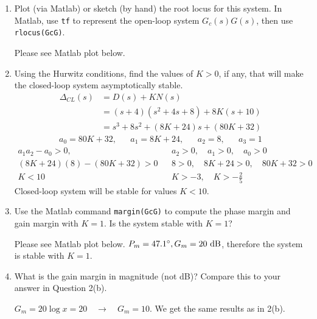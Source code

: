 \documentclass[11pt]{article}
\begin{document}
\begin{enumerate}
        \begin{enumerate}
            \item Plot (via Matlab) or sketch (by hand) the root locus for this system. In Matlab, use \texttt{tf} to represent the open-loop system \(G_c(s)G(s)\), then use \texttt{rlocus(GcG)}.\par
            \color{CrispBlue}
            Please see Matlab plot below.
            \color{black}
            \item Using the Hurwitz conditions, find the values of \(K >0\), if any, that will make the closed-loop system asymptotically stable.
                \color{CrispBlue}
                \begin{align*}
                    \Delta_{CL}(s) &= D(s) + K N(s)\\
                    &= (s+4)(s^2+4s+8)+8K(s+10)\\
                    &=s^3+8s^2+(8K+24)s+(80K+32)
                \end{align*}
                \begin{align*}
                    a_0=80K+32, && a_1=8K+24, && a_2=8, && a_3=1
                \end{align*}
                \begin{align*}
                    a_1a_2-a_0>0, && a_2>0,\quad a_1>0,\quad a_0>0\\
                    (8K+24)(8)-(80K+32)>0 && 8>0,\quad 8K+24>0,\quad 80K+32>0\\
                    K<10 && K>-3,\quad K>-\frac{2}{5}
                \end{align*}
                Closed-loop system will be stable for values \(K<10\).
                \color{black}
            \item Use the Matlab command \texttt{margin(GcG)} to compute the phase margin and gain margin with \(K= 1\). Is the system stable with \(K= 1\)?\par
                \color{CrispBlue}
                Please see Matlab plot below. \(P_m = 47.1 \degree , G_m = 20 \text{ dB}\), therefore the system is stable with \(K= 1\).
                \color{black}
            \item What is the gain margin in magnitude (not dB)? Compare this to your answer in Question 2(b).\par
                \color{CrispBlue}
                \( G_m = 20 \log{x}=20 \quad \rightarrow \quad G_m = 10\). We get the same results as in 2(b).
                \color{black}
        \end{enumerate}

\end{enumerate}
\end{document}

